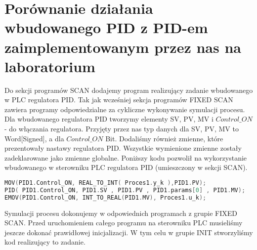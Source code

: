 \chapter{Porównanie działania wbudowanego PID z PID-em zaimplementowanym przez nas na laboratorium}
\label{pid_wbudowany}
Do sekcji programów SCAN dodajemy program realizujący zadanie wbudowanego w PLC regulatora PID. Tak jak wcześniej sekcja programów FIXED SCAN zawiera programy odpowiedzialne za cykliczne wykonywanie symulacji procesu. Dla wbudowanego regulatora PID tworzymy elementy SV, PV, MV i $Control\_ON$ - do włączania regulatora. Przyjęty przez nas typ danych dla SV, PV, MV to Word[Signed], a dla $Control\_ON$ Bit. Dodaliśmy również zmienne, które prezentowały nastawy regulatora PID. Wszystkie wymienione zmienne zostały zadeklarowane jako zmienne globalne. Poniższy kodu pozwolił na wykorzystanie wbudowanego w sterowniku PLC regulatora PID (umieszczony w sekcji SCAN). 
\begin{lstlisting}[caption={Użycie wbudowanego regulatora PID}, language=C]
MOV(PID1.Control_ON, REAL_TO_INT( Proces1.y_k ),PID1.PV);
PID( PID1.Control_ON, PID1.SV , PID1.PV , PID1.params[0] , PID1.MV);
EMOV(PID1.Control_ON, INT_TO_REAL(PID1.MV), Proces1.u_k);
\end{lstlisting}
Symulacji procesu dokonujemy w odpowiednich programach z grupie FIXED SCAN. Przed uruchomieniem całego programu na sterowniku PLC musieliśmy jeszcze dokonać prawidłowej inicjalizacji. W tym celu w grupie INIT stworzyliśmy kod realizujący to zadanie. 